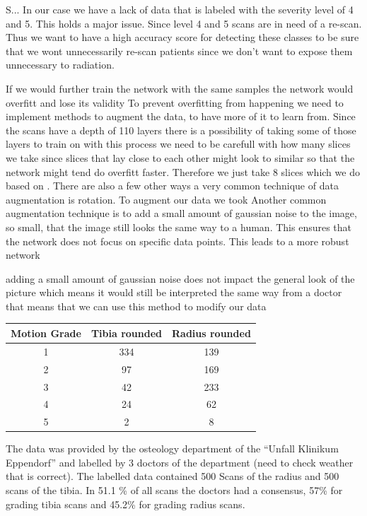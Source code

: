 \documentclass[
a4paper, 
12pt,
grayscalebody, %
abstract=on,
twoside, BCOR10mm, 12pt, DIV13,headinclude, footexclude, final, abstracton, openright
]{ibireprt}
\numberwithin{equation}{chapter}
\numberwithin{table}{chapter}
\numberwithin{figure}{chapter}
\numberwithin{algorithm}{chapter}
\numberwithin{example}{chapter}
\numberwithin{example}{chapter}
\begin{document}
  S... In our case we have a lack of data that is labeled with the severity level of 4 and 5. This holds a major issue. Since level 4 and 5 scans are in need of a re-scan. Thus we want to have a high accuracy score for detecting these classes to be sure that we wont unnecessarily re-scan patients since we don't want to expose them unnecessary to radiation.
 
 If we would further train the network with the same samples the network would overfitt and lose its validity  To prevent overfitting from happening we need to implement methods to augment the data, to have more of it to learn from. Since the scans have a depth of 110 layers there is a possibility of taking some of those layers to train on with this process we need to be carefull with how many slices we take since slices that lay close to each other might look to similar so that the network might tend do overfitt faster. Therefore we just take 8 slices which we do based on \cite{Walle2023}. There are also a few other ways a very common technique of data augmentation is rotation. To augment our data we took %
Another common augmentation technique is to add  a small amount of gaussian noise to the image, so small, that the image still looks the same way to a human. This ensures that the network does not focus on specific data points. This leads to a more robust network

adding a small amount of gaussian noise does not impact the general look of the picture which means it would still be interpreted the same way from a doctor that means that we can use this method to modify our data


\begin{table}[h]
	\centering
	\begin{tabular}{||c|c|c||}
		\hline
		 Motion Grade&  Tibia rounded& Radius rounded  	\\
		\hline
		\hline
		1 &  334&  139   \\
		\hline
		2 &  97&  169 	\\
		\hline
		3 &  42&  233   \\
		\hline
		4 &  24&  62   \\
		\hline
		5 &  2&  8 \\
		\hline
	\end{tabular}
\end{table}
The data was provided by the osteology department of the ``Unfall Klinikum Eppendorf'' and labelled by 3 doctors of the department (need to check weather that is correct). The labelled data contained 500 Scans of the radius and 500 scans of the tibia. In  51.1 \% of all scans the doctors had a consensus, 57\% for grading tibia scans and 45.2\% for grading radius scans. 
\end{document}
